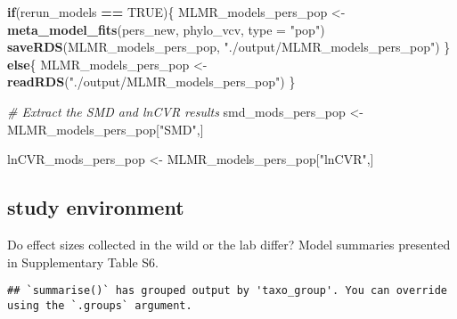 \documentclass[]{article}
\newenvironment{Shaded}{\begin{snugshade}}{\end{snugshade}}
\newcommand{\KeywordTok}[1]{\textcolor[rgb]{0.13,0.29,0.53}{\textbf{#1}}}
\newcommand{\DataTypeTok}[1]{\textcolor[rgb]{0.13,0.29,0.53}{#1}}
\newcommand{\StringTok}[1]{\textcolor[rgb]{0.31,0.60,0.02}{#1}}
\newcommand{\CommentTok}[1]{\textcolor[rgb]{0.56,0.35,0.01}{\textit{#1}}}
\newcommand{\OtherTok}[1]{\textcolor[rgb]{0.56,0.35,0.01}{#1}}
\newcommand{\ControlFlowTok}[1]{\textcolor[rgb]{0.13,0.29,0.53}{\textbf{#1}}}
\newcommand{\OperatorTok}[1]{\textcolor[rgb]{0.81,0.36,0.00}{\textbf{#1}}}
\newcommand{\NormalTok}[1]{#1}
\begin{document}
\begin{Shaded}
\begin{Highlighting}[]
  \ControlFlowTok{if}\NormalTok{(rerun_models }\OperatorTok{==}\StringTok{ }\OtherTok{TRUE}\NormalTok{)\{}
\NormalTok{      MLMR_models_pers_pop <-}\StringTok{ }\KeywordTok{meta_model_fits}\NormalTok{(pers_new, phylo_vcv, }\DataTypeTok{type =} \StringTok{"pop"}\NormalTok{)}
      \KeywordTok{saveRDS}\NormalTok{(MLMR_models_pers_pop, }\StringTok{"./output/MLMR_models_pers_pop"}\NormalTok{)}
\NormalTok{    \} }\ControlFlowTok{else}\NormalTok{\{}
\NormalTok{     MLMR_models_pers_pop <-}\StringTok{ }\KeywordTok{readRDS}\NormalTok{(}\StringTok{"./output/MLMR_models_pers_pop"}\NormalTok{)}
\NormalTok{    \}}

\CommentTok{# Extract the SMD and lnCVR results}
\NormalTok{  smd_mods_pers_pop <-}\StringTok{ }\NormalTok{MLMR_models_pers_pop[}\StringTok{"SMD"}\NormalTok{,]}
    
\NormalTok{  lnCVR_mods_pers_pop <-}\StringTok{ }\NormalTok{MLMR_models_pers_pop[}\StringTok{"lnCVR"}\NormalTok{,]}
\end{Highlighting}
\end{Shaded}

\subsection{study environment}\label{study-environment}

Do effect sizes collected in the wild or the lab differ? Model summaries
presented in Supplementary Table S6.

\begin{Shaded}
\end{Shaded}

\begin{verbatim}
## `summarise()` has grouped output by 'taxo_group'. You can override using the `.groups` argument.
\end{verbatim}
\end{document}
